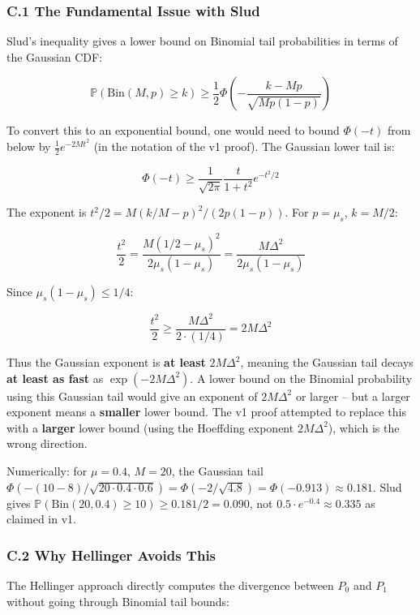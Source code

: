 \documentclass[
  12pt,
]{article}
\begin{document}
\subsubsection{C.1 The Fundamental Issue with
Slud}\label{c.1-the-fundamental-issue-with-slud}

Slud's inequality gives a lower bound on Binomial tail probabilities in
terms of the Gaussian CDF:

\[\mathbb{P}(\text{Bin}(M,p) \geq k) \geq \frac12 \Phi\!\left(-\frac{k-Mp}{\sqrt{Mp(1-p)}}\right)\]

To convert this to an exponential bound, one would need to bound
\(\Phi(-t)\) from below by \(\frac12 e^{-2Mt^2}\) (in the notation of
the v1 proof). The Gaussian lower tail is:

\[\Phi(-t) \geq \frac{1}{\sqrt{2\pi}} \frac{t}{1+t^2} e^{-t^2/2}\]

The exponent is \(t^2/2 = M(k/M-p)^2 / (2p(1-p))\). For \(p = \mu_s\),
\(k = M/2\):

\[\frac{t^2}{2} = \frac{M(1/2 - \mu_s)^2}{2\mu_s(1-\mu_s)} = \frac{M\Delta^2}{2\mu_s(1-\mu_s)}\]

Since \(\mu_s(1-\mu_s) \leq 1/4\):

\[\frac{t^2}{2} \geq \frac{M\Delta^2}{2 \cdot (1/4)} = 2M\Delta^2\]

Thus the Gaussian exponent is \textbf{at least} \(2M\Delta^2\), meaning
the Gaussian tail decays \textbf{at least as fast} as
\(\exp(-2M\Delta^2)\). A lower bound on the Binomial probability using
this Gaussian tail would give an exponent of \(2M\Delta^2\) or larger --
but a larger exponent means a \textbf{smaller} lower bound. The v1 proof
attempted to replace this with a \textbf{larger} lower bound (using the
Hoeffding exponent \(2M\Delta^2\)), which is the wrong direction.

Numerically: for \(\mu=0.4\), \(M=20\), the Gaussian tail
\(\Phi(-(10-8)/\sqrt{20\cdot0.4\cdot0.6}) = \Phi(-2/\sqrt{4.8}) = \Phi(-0.913) \approx 0.181\).
Slud gives
\(\mathbb{P}(\text{Bin}(20,0.4) \geq 10) \geq 0.181/2 = 0.090\), not
\(0.5\cdot e^{-0.4} \approx 0.335\) as claimed in v1.

\subsubsection{C.2 Why Hellinger Avoids
This}\label{c.2-why-hellinger-avoids-this}

The Hellinger approach directly computes the divergence between \(P_0\)
and \(P_1\) without going through Binomial tail bounds:
\end{document}

